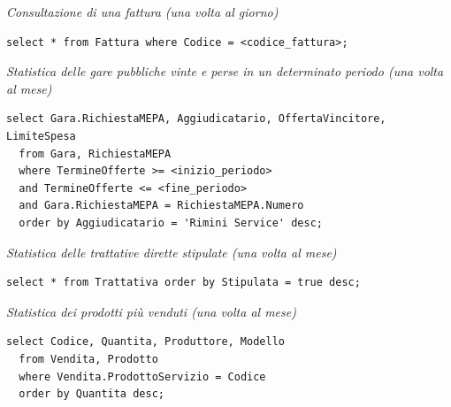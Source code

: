 \noindent\textit{Consultazione di una fattura (una volta al giorno)}
\begin{verbatim}
select * from Fattura where Codice = <codice_fattura>;
\end{verbatim}
\vspace{1cm}

\noindent\textit{Statistica delle gare pubbliche vinte e perse in un determinato periodo (una volta al mese)}
\begin{verbatim}
select Gara.RichiestaMEPA, Aggiudicatario, OffertaVincitore, LimiteSpesa
  from Gara, RichiestaMEPA
  where TermineOfferte >= <inizio_periodo>
  and TermineOfferte <= <fine_periodo>
  and Gara.RichiestaMEPA = RichiestaMEPA.Numero
  order by Aggiudicatario = 'Rimini Service' desc;
\end{verbatim}
\vspace{0.5cm}

\noindent{}
\newline\newline

\noindent\textit{Statistica delle trattative dirette stipulate (una volta al mese)}
\begin{verbatim}
select * from Trattativa order by Stipulata = true desc;
\end{verbatim}
\vspace{0.5cm}

\noindent{}
\newline\newline

\noindent\textit{Statistica dei prodotti più venduti (una volta al mese)}
\begin{verbatim}
select Codice, Quantita, Produttore, Modello
  from Vendita, Prodotto
  where Vendita.ProdottoServizio = Codice
  order by Quantita desc;
\end{verbatim}
\vspace{0.5cm}

